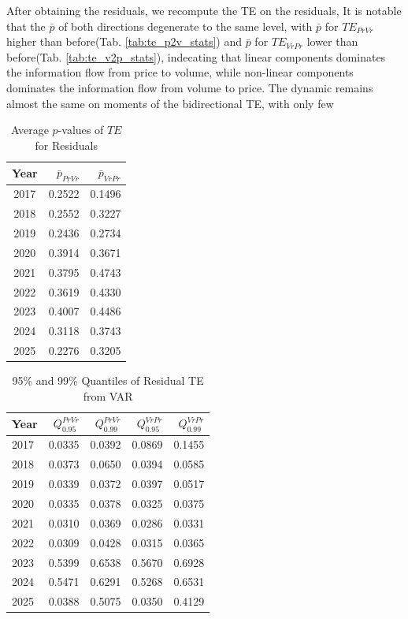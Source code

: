 \documentclass{elsarticle}
\def\rightarrow{}%
\begin{document}
After obtaining the residuals, we recompute the TE on the residuals, It is notable that the $\bar{p}$ of both directions degenerate to the same level, with $\bar{p}$ for $TE_{Pr \rightarrow Vr}$ higher than before(Tab. \ref{tab:te_p2v_stats}) and $\bar{p}$ for $TE_{Vr \rightarrow Pr}$ lower than before(Tab. \ref{tab:te_v2p_stats}), indecating that linear components dominates the information flow from price to volume, while non-linear components dominates the information flow from volume to price. The dynamic remains almost the same on moments of the bidirectional TE, with only few 
\begin{table}[H]
  \caption{Average $p$‑values of $TE$ for Residuals}
  \label{tab:ter_residual_pvalues}
  \centering
  \begin{tabular}{crr}
    \hline\noalign{\smallskip}
    \textbf{Year} & $\bar{p}_{Pr \rightarrow Vr}$ & $\bar{p}_{Vr \rightarrow Pr}$ \\
    \hline\noalign{\smallskip}
    2017 & 0.2522 & 0.1496 \\
    2018 & 0.2552 & 0.3227 \\
    2019 & 0.2436 & 0.2734 \\
    2020 & 0.3914 & 0.3671 \\
    2021 & 0.3795 & 0.4743 \\
    2022 & 0.3619 & 0.4330 \\
    2023 & 0.4007 & 0.4486 \\
    2024 & 0.3118 & 0.3743 \\
    2025 & 0.2276 & 0.3205 \\
    \hline
  \end{tabular}
\end{table}


\begin{table}[H]
  \caption{95\% and 99\% Quantiles of Residual TE from VAR}
  \label{tab:ter_residual_quantiles}
  \centering
  \begin{tabular}{lrrrr}
    \hline\noalign{\smallskip}
    \textbf{Year} & $Q_{0.95}^{Pr \rightarrow Vr}$ & $Q_{0.99}^{Pr \rightarrow Vr}$ & $Q_{0.95}^{Vr \rightarrow Pr}$ & $Q_{0.99}^{Vr \rightarrow Pr}$ \\
    \hline\noalign{\smallskip}
    2017 & 0.0335 & 0.0392 & 0.0869 & 0.1455 \\
    2018 & 0.0373 & 0.0650 & 0.0394 & 0.0585 \\
    2019 & 0.0339 & 0.0372 & 0.0397 & 0.0517 \\
    2020 & 0.0335 & 0.0378 & 0.0325 & 0.0375 \\
    2021 & 0.0310 & 0.0369 & 0.0286 & 0.0331 \\
    2022 & 0.0309 & 0.0428 & 0.0315 & 0.0365 \\
    2023 & 0.5399 & 0.6538 & 0.5670 & 0.6928 \\
    2024 & 0.5471 & 0.6291 & 0.5268 & 0.6531 \\
    2025 & 0.0388 & 0.5075 & 0.0350 & 0.4129 \\
    \hline
  \end{tabular}
\end{table}
\end{document}
